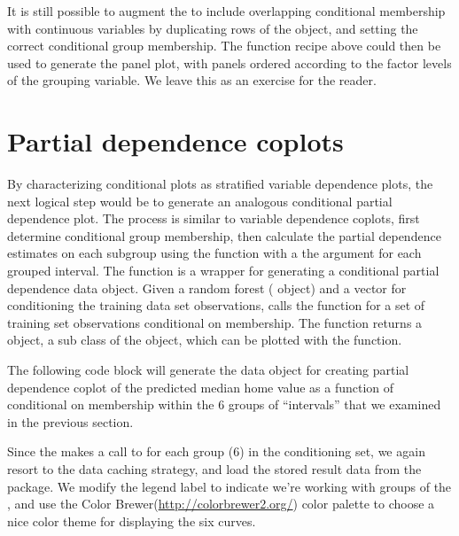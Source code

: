 \documentclass[nojss]{jss}\usepackage[]{graphicx}\usepackage[]{color}
\begin{document}
It is still possible to augment the  to include overlapping conditional membership with continuous variables by duplicating rows of the object, and setting the correct conditional group membership. The  function recipe above could then be used to generate the panel plot, with panels ordered according to the factor levels of the grouping variable. We leave this as an exercise for the reader.

\section{Partial dependence coplots}\label{partialcoplots}

By characterizing conditional plots as stratified variable dependence plots, the next logical step would be to generate an analogous conditional partial dependence plot. The process is similar to variable dependence coplots, first determine conditional group membership, then calculate the partial dependence estimates on each subgroup using the  function with a the  argument for each grouped interval. The  function is a wrapper for generating a conditional partial dependence data object. Given a random forest ( object) and a  vector for conditioning the training data set observations,  calls the  function for a set of training set observations conditional on  membership. The function returns a  object, a sub class of the  object, which can be plotted with the  function.

The following code block will generate the data object for creating partial dependence coplot of the predicted median home value as a function of  conditional on membership within the 6 groups of  ``intervals'' that we examined in the previous section.




Since the  makes a call to  for each group (6) in the conditioning set, we again resort to the data caching strategy, and load the stored result data from the  package. We modify the legend label to indicate we're working with groups of the , and use the  Color Brewer(\url{http://colorbrewer2.org/}) color palette to choose a nice color theme for displaying the six curves.
\end{document}
